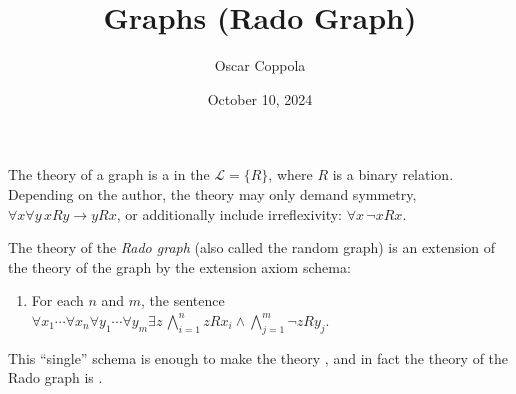 \documentclass[a4paper]{article}
\title{Graphs (Rado Graph)}
\date{October 10, 2024}
\author{Oscar Coppola}
\begin{document}
\maketitle
\par{
    The theory of a graph is a  in the  \(\mathcal  L= \{ R \}\), where \(R\) is a binary relation.
    Depending on the author, the theory may only demand symmetry, \(\forall  x \forall  y \, xRy \rightarrow  yRx\),
    or additionally include irreflexivity: \(\forall  x \, \neg  xRx\).
}\par{
    The theory of the \emph{Rado graph} (also called the random graph) is an extension of the theory of the graph by the extension axiom schema:
    \begin{enumerate}
\item{
            For each \(n\) and \(m\), the sentence
            \(\forall  x_1 \cdots \forall  x_n \forall  y_1 \cdots \forall  y_m \exists  z \, \bigwedge _{i=1}^nzRx_i \land \bigwedge _{j=1}^m \neg  zRy_j\).
        }
\end{enumerate}
    This ``single'' schema is enough to make the theory ,
    and in fact the theory of the Rado graph is .
}
\printbibliography
\end{document}
